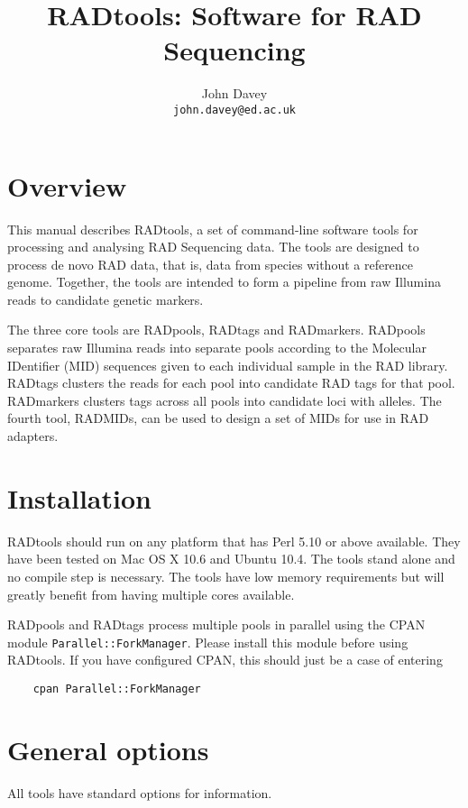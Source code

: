 \documentclass[a4paper]{article}
\title{RADtools: Software for RAD Sequencing}
\author{John Davey\\{\tt john.davey@ed.ac.uk}}
\begin{document}
\maketitle

\section{Overview}

This manual describes RADtools, a set of command-line software tools for processing and analysing RAD Sequencing data. The tools are designed to process de novo RAD data, that is, data from species without a reference genome. Together, the tools are intended to form a pipeline from raw Illumina reads to candidate genetic markers.

The three core tools are RADpools, RADtags and RADmarkers. RADpools separates raw Illumina reads into separate pools according to the Molecular IDentifier (MID) sequences given to each individual sample in the RAD library. RADtags clusters the reads for each pool into candidate RAD tags for that pool. RADmarkers clusters tags across all pools into candidate loci with alleles. The fourth tool, RADMIDs, can be used to design a set of MIDs for use in RAD adapters.


\section{Installation}

RADtools should run on any platform that has Perl 5.10 or above available. They have been tested on Mac OS X 10.6 and Ubuntu 10.4. The tools stand alone and no compile step is necessary. The tools have low memory requirements but will greatly benefit from having multiple cores available.

RADpools and RADtags process multiple pools in parallel using the CPAN module \verb|Parallel::ForkManager|. Please install this module before using RADtools. If you have configured CPAN, this should just be a case of entering

\begin{verbatim}
    cpan Parallel::ForkManager
\end{verbatim}

\section{General options}

All tools have standard options for information.
\end{document}
